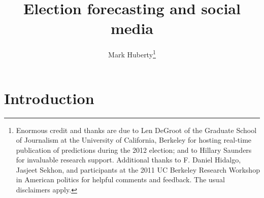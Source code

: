 \documentclass{article}
\begin{document}
\title{Election forecasting and social media}
\author{
Mark Huberty\thanks{Enormous credit and thanks are due to Len DeGroot of the
  Graduate School of Journalism at the University of California,
  Berkeley for hosting real-time publication of predictions during the
2012 election; and to Hillary Saunders for invaluable research
support. Additional thanks to F. Daniel Hidalgo, Jasjeet Sekhon, and
participants at the 2011 UC Berkeley Research Workshop in American
politics for helpful comments and feedback. The usual disclaimers apply.}
}

\maketitle
\begin{abstract}

\end{abstract}

\doublespacing
\section{Introduction}
\label{sec:introduction}

\end{document}
